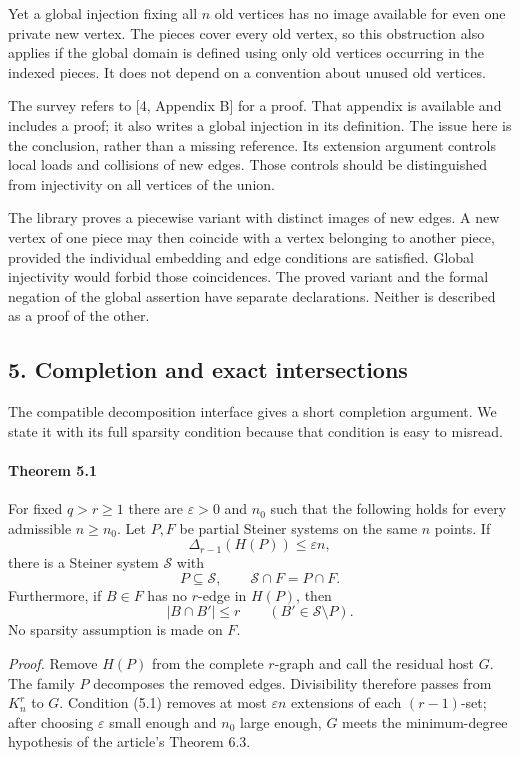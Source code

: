 \documentclass[english,11pt,a4paper]{article}
\begin{document}
Yet a global injection fixing all \(n\) old vertices has no image available for even one private new vertex. The pieces cover every old vertex, so this obstruction also applies if the global domain is defined using only old vertices occurring in the indexed pieces. It does not depend on a convention about unused old vertices.

The survey refers to {[}4, Appendix B{]} for a proof. That appendix is available and includes a proof; it also writes a global injection in its definition. The issue here is the conclusion, rather than a missing reference. Its extension argument controls local loads and collisions of new edges. Those controls should be distinguished from injectivity on all vertices of the union.

The library proves a piecewise variant with distinct images of new edges. A new vertex of one piece may then coincide with a vertex belonging to another piece, provided the individual embedding and edge conditions are satisfied. Global injectivity would forbid those coincidences. The proved variant and the formal negation of the global assertion have separate declarations. Neither is described as a proof of the other.

\subsection{5. Completion and exact intersections}\label{completion-and-exact-intersections}

The compatible decomposition interface gives a short completion argument. We state it with its full sparsity condition because that condition is easy to misread.

\par
\begin{samepage}
\paragraph{Theorem 5.1}\label{theorem-5.1}

For fixed \(q>r\ge1\) there are \(\varepsilon>0\) and \(n_0\) such that the following holds for every admissible \(n\ge n_0\). Let \(P,F\) be partial Steiner systems on the same \(n\) points. If \[\Delta_{r-1}(H(P))\le\varepsilon n,
\tag{5.1}\] there is a Steiner system \(\mathcal S\) with \[P\subseteq\mathcal S,\qquad
\mathcal S\cap F=P\cap F.
\tag{5.2}\] Furthermore, if \(B\in F\) has no \(r\)-edge in \(H(P)\), then \[|B\cap B'|\le r
\qquad(B'\in\mathcal S\setminus P).
\tag{5.3}\] No sparsity assumption is made on \(F\).

\end{samepage}
\emph{Proof.} Remove \(H(P)\) from the complete \(r\)-graph and call the residual host \(G\). The family \(P\) decomposes the removed edges. Divisibility therefore passes from \(K_n^r\) to \(G\). Condition (5.1) removes at most \(\varepsilon n\) extensions of each \((r-1)\)-set; after choosing \(\varepsilon\) small enough and \(n_0\) large enough, \(G\) meets the minimum-degree hypothesis of the article's Theorem 6.3.
\end{document}
